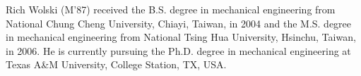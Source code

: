 \documentclass{ieeeaccess}
\begin{document}
\begin{IEEEbiography}{Rich Wolski} (M'87) received the B.S. degree in mechanical 
engineering from National Chung Cheng University, Chiayi, Taiwan, in 2004 
and the M.S. degree in mechanical engineering from National Tsing Hua 
University, Hsinchu, Taiwan, in 2006. He is currently pursuing the Ph.D. 
degree in mechanical engineering at Texas A{\&}M University, College 
Station, TX, USA.

\end{IEEEbiography}


\EOD
\end{document}
